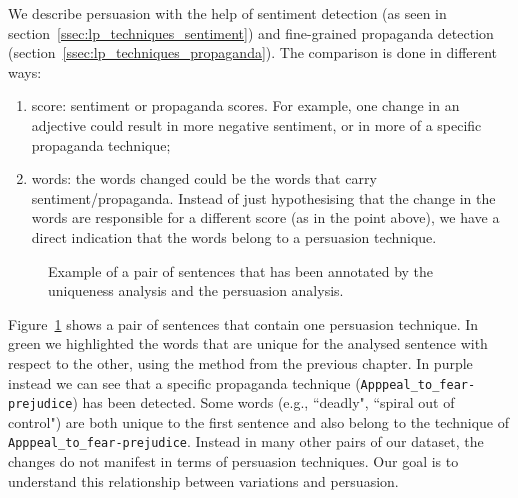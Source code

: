 We describe persuasion with the help of sentiment detection (as seen in section~\ref{ssec:lp_techniques_sentiment}) and fine-grained propaganda detection (section~\ref{ssec:lp_techniques_propaganda}).
The comparison is done in different ways:
\begin{enumerate}
    \item score: sentiment or propaganda scores. For example, one change in an adjective could result in more negative sentiment, or in more of a specific propaganda technique;
    \item words: the words changed could be the words that carry sentiment/propaganda. Instead of just hypothesising that the change in the words are responsible for a different score (as in the point above), we have a direct indication that the words belong to a persuasion technique.
\end{enumerate}

\begin{figure}[!htbp]
    \centering
    \caption{Example of a pair of sentences that has been annotated by the uniqueness analysis and the persuasion analysis.}
    \label{fig:annotated_clique_data}
\end{figure}

Figure~\ref{fig:annotated_clique_data} shows a pair of sentences that contain one persuasion technique.
In green we highlighted the words that are unique for the analysed sentence with respect to the other, using the method from the previous chapter.
In purple instead we can see that a specific propaganda technique (\texttt{Apppeal\_to\_fear-prejudice}) has been detected.
Some words (e.g., ``deadly", ``spiral out of control") are both unique to the first sentence and also belong to the technique of \texttt{Apppeal\_to\_fear-prejudice}. Instead in many other pairs of our dataset, the changes do not manifest in terms of persuasion techniques.
Our goal is to understand this relationship between variations and persuasion.

